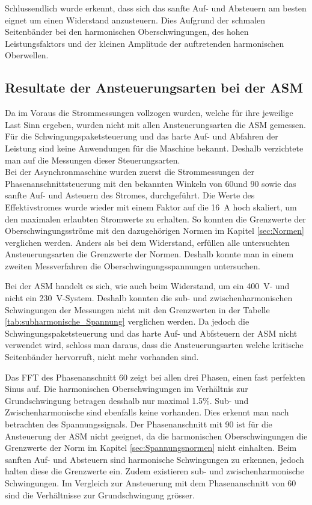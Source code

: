 Schlussendlich wurde erkennt, dass sich das sanfte Auf- und Absteuern am besten eignet um einen Widerstand anzusteuern. Dies Aufgrund der schmalen Seitenbänder bei den harmonischen Oberschwingungen, des hohen Leistungsfaktors und der kleinen Amplitude der auftretenden harmonischen Oberwellen. 

\subsection{Resultate der Ansteuerungsarten bei der ASM}
Da im Voraus die Strommessungen vollzogen wurden, welche für ihre jeweilige Last Sinn ergeben, wurden nicht mit allen Ansteuerungsarten die ASM gemessen. Für die Schwingungspaketsteuerung und das harte Auf- und Abfahren der Leistung sind keine Anwendungen für die Maschine bekannt. Deshalb verzichtete man auf die Messungen dieser Steuerungsarten.\\

Bei der Asynchronmaschine wurden zuerst die Strommessungen der Phasenanschnittsteuerung mit den bekannten Winkeln von 60\textdegree und 90\textdegree \hspace{0.02cm} sowie das sanfte Auf- und Asteuern des Stromes, durchgeführt. Die Werte des Effektivstromes wurde wieder mit einem Faktor auf die \SI{16}{A} hoch skaliert, um den maximalen erlaubten Stromwerte zu erhalten. So konnten die Grenzwerte der Oberschwingungsströme mit den dazugehörigen Normen im Kapitel \ref{sec:Normen} verglichen werden. Anders als bei dem Widerstand, erfüllen alle untersuchten Ansteuerungsarten die Grenzwerte der Normen. Deshalb konnte man in einem zweiten Messverfahren die Oberschwingungsspannungen untersuchen.

Bei der ASM handelt es sich, wie auch beim Widerstand, um ein \SI{400}{V}- und nicht ein \SI{230}{V}-System. Deshalb konnten die sub- und zwischenharmonischen Schwingungen der Messungen nicht mit den Grenzwerten in der Tabelle \ref{tab:subharmonische_Spannung} verglichen werden.
Da jedoch die Schwingungspaketsteuerung und das harte Auf- und Abfsteuern der ASM nicht verwendet wird, schloss man daraus, dass die Ansteuerungsarten welche kritische Seitenbänder hervorruft, nicht mehr vorhanden sind. 


Das FFT des Phasenanschnitt 60\textdegree \hspace{0.02cm} zeigt bei allen drei Phasen, einen fast perfekten Sinus auf.
Die harmonischen Oberschwingungen im Verhältnis zur Grundschwingung betragen desshalb nur maximal 1.5\%. Sub- und Zwischenharmonische sind ebenfalls keine vorhanden. Dies erkennt man nach betrachten des Spannungssignals.
Der Phasenanschnitt mit 90\textdegree \hspace{0.02cm} ist für die Ansteuerung der ASM nicht geeignet, da die harmonischen Oberschwingungen die Grenzwerte der Norm im Kapitel \ref{sec:Spannungsnormen} nicht einhalten. 
Beim sanften Auf- und Absteuern sind harmonische Schwingungen zu erkennen, jedoch halten diese die Grenzwerte ein. Zudem existieren sub- und zwischenharmonische Schwingungen. Im Vergleich zur Ansteuerung mit dem Phasenanschnitt von 60\textdegree \hspace{0.02cm} sind die Verhältnisse zur Grundschwingung grösser.\\ 

